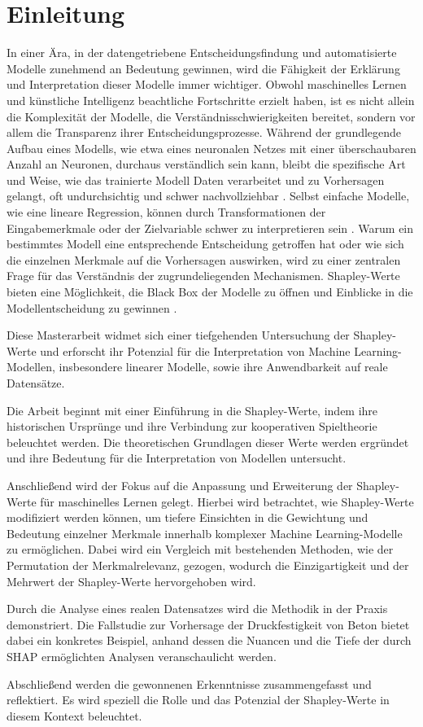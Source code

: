 \chapter{Einleitung}

In einer Ära, in der datengetriebene Entscheidungsfindung und automatisierte Modelle zunehmend an Bedeutung gewinnen,
wird die Fähigkeit der Erklärung und Interpretation dieser Modelle immer wichtiger. 
Obwohl maschinelles Lernen und künstliche Intelligenz beachtliche Fortschritte erzielt haben, ist es nicht allein die Komplexität 
der Modelle, die Verständnisschwierigkeiten bereitet, sondern vor allem die Transparenz ihrer Entscheidungsprozesse. 
Während der grundlegende Aufbau eines Modells, wie etwa eines neuronalen Netzes mit einer überschaubaren Anzahl an Neuronen, 
durchaus verständlich sein kann, bleibt die spezifische Art und Weise, wie das trainierte Modell Daten verarbeitet und zu Vorhersagen gelangt,
oft undurchsichtig und schwer nachvollziehbar \cite[S. 4f]{Molnar_2023}. Selbst einfache Modelle, wie eine lineare Regression,
können durch Transformationen der Eingabemerkmale oder der Zielvariable schwer zu interpretieren sein \cite[S. 6]{Molnar_2023}. 
Warum ein bestimmtes Modell eine entsprechende Entscheidung getroffen hat oder wie sich die einzelnen
Merkmale auf die Vorhersagen auswirken, wird zu einer zentralen Frage für das Verständnis der zugrundeliegenden Mechanismen. 
Shapley-Werte bieten eine Möglichkeit, die \glqq{}Black Box\grqq{} der Modelle zu öffnen und Einblicke 
in die Modellentscheidung zu gewinnen \cite[S. 215f]{Molnar_2022}. 

Diese Masterarbeit widmet sich einer tiefgehenden Untersuchung der Shapley-Werte und erforscht ihr Potenzial für die Interpretation
von Machine Learning-Modellen, insbesondere linearer Modelle, sowie ihre Anwendbarkeit auf reale Datensätze.

Die Arbeit beginnt mit einer Einführung in die Shapley-Werte, indem ihre historischen Ursprünge 
und ihre Verbindung zur kooperativen Spieltheorie beleuchtet werden. Die theoretischen Grundlagen dieser Werte werden 
ergründet und ihre Bedeutung für die Interpretation von Modellen untersucht.

Anschließend wird der Fokus auf die Anpassung und Erweiterung der Shapley-Werte für maschinelles Lernen gelegt. 
Hierbei wird betrachtet, wie Shapley-Werte modifiziert werden können, um tiefere Einsichten in die Gewichtung 
und Bedeutung einzelner Merkmale innerhalb komplexer Machine Learning-Modelle zu ermöglichen. Dabei wird ein Vergleich 
mit bestehenden Methoden, wie der Permutation der Merkmalrelevanz, gezogen, wodurch die Einzigartigkeit und der Mehrwert der 
Shapley-Werte hervorgehoben wird.

Durch die Analyse eines realen Datensatzes wird die Methodik in der Praxis demonstriert. Die Fallstudie zur Vorhersage der 
Druckfestigkeit von Beton bietet dabei ein konkretes Beispiel, anhand dessen die Nuancen und die Tiefe der durch SHAP 
ermöglichten Analysen veranschaulicht werden.

Abschließend werden die gewonnenen Erkenntnisse zusammengefasst und reflektiert. Es wird speziell die Rolle und das 
Potenzial der Shapley-Werte in diesem Kontext beleuchtet.